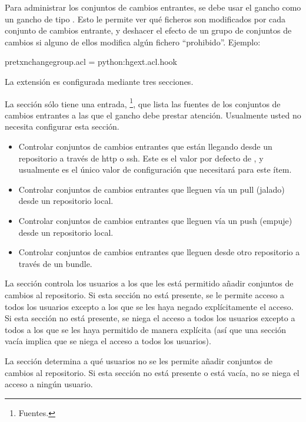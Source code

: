 Para administrar los conjuntos de cambios entrantes, se debe usar el
gancho  como un gancho de tipo .
Esto le permite ver qué ficheros son modificados por cada conjunto de
cambios entrante, y deshacer el efecto de un grupo de conjuntos de
cambios si alguno de ellos modifica algún fichero ``prohibido''.
Ejemplo:
\begin{codesample2}
  [hooks]
  pretxnchangegroup.acl = python:hgext.acl.hook
\end{codesample2}

La extensión  es configurada mediante tres secciones.

La sección  sólo tiene una entrada,
\footnote{Fuentes.}, que lista las fuentes de los
conjuntos de cambios entrantes a las que el gancho debe prestar
atención. Usualmente usted no necesita configurar esta sección.
\begin{itemize}
  \item[\rcitem{acl}{serve}] Controlar conjuntos de
    cambios entrantes que están llegando desde un repositorio a
    través de http o ssh. Este es el valor por defecto de
  , y usualmente es el único valor de
  configuración que necesitará para este ítem.
\item[\rcitem{acl}{pull}] Controlar conjuntos de cambios entrantes que
  lleguen vía un pull (jalado) desde un repositorio local.
\item[\rcitem{acl}{push}] Controlar conjuntos de cambios entrantes que
  lleguen vía un push (empuje) desde un repositorio local.
\item[\rcitem{acl}{bundle}] Controlar conjuntos de cambios entrantes
  que lleguen desde otro repositorio a través de un bundle.
\end{itemize}

La sección  controla los usuarios a los que les
está permitido añadir conjuntos de cambios al repositorio. Si esta
sección no está presente, se le permite acceso a todos los usuarios
excepto  a los que se les haya negado explícitamente el acceso. Si
esta sección no está presente, se niega el acceso a todos los usuarios
excepto a todos a los que se les haya permitido de manera explícita
(así que una sección vacía implica que se niega el acceso a todos los
usuarios).

La sección  determina a qué usuarios no se les
permite añadir conjuntos de cambios al repositorio. Si esta sección no
está presente o está vacía, no se niega el acceso a ningún usuario.

